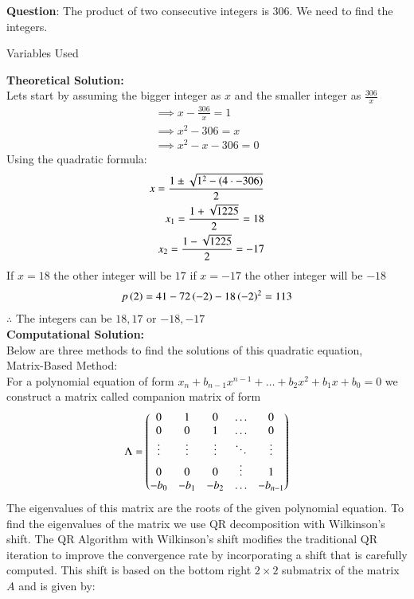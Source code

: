 \documentclass[journal]{IEEEtran}
\begin{document}
\textbf{Question}:\newline
The product of two consecutive integers is $306$. We need to find the integers.
\newline
\begin{table}[h!]    
  \centering
  
  \caption{Variables Used}
  \label{tab1.1.2.2}
\end{table}
\newline
\textbf{Theoretical Solution:}\\
Lets start by assuming the bigger integer as $x$ and the smaller integer as $\frac{306}{x}$
\begin{align}
    \implies x-\frac{306}{x}=1\\
    \implies x^2-306=x\\
    \implies x^2-x-306=0
\end{align}
Using the quadratic formula:
\begin{align}
    x=\frac{1\pm\sqrt{1^2-\left(4\cdot -306\right)}}{2}\\
    x_1=\frac{1+\sqrt{1225}}{2}=18\\
    x_2=\frac{1-\sqrt{1225}}{2}=-17
\end{align}
If $x=18$ the other integer will be $17$ if $x=-17$ the other integer will be $-18$
\begin{align}
    p\left(2\right)=41-72\left(-2\right)-18\left(-2\right)^2=113
\end{align}
$\therefore$ The integers can be $18,17$ or $-18,-17$\\
\textbf{Computational Solution:}\\
Below are three methods to find the solutions of this quadratic equation,\\
Matrix-Based Method:\\
For a polynomial equation of form $x_n+b_{n-1}x^{n-1}+\dots+b_2x^2+b_1x+b_0 = 0$ we construct a matrix called companion matrix of form
\begin{align}
	\Lambda = \begin{pmatrix}0&1&0&\dots&0\\ 0&0&1&\dots&0\\ \vdots &\vdots &\vdots &\ddots&\vdots\\0&0&0&\vdots&1\\-b_0&-b_1&-b_2&\dots&-b_{n-1}\end{pmatrix}
\end{align}
The eigenvalues of this matrix are the roots of the given polynomial equation.
To find the eigenvalues of the matrix we use QR decomposition with Wilkinson's shift.
The QR Algorithm with Wilkinson's shift modifies the traditional QR iteration to improve the convergence rate by incorporating a shift that is carefully computed. This shift is based on the bottom right $2\times 2$ submatrix of the matrix $A$ and is given by:
\end{document}

